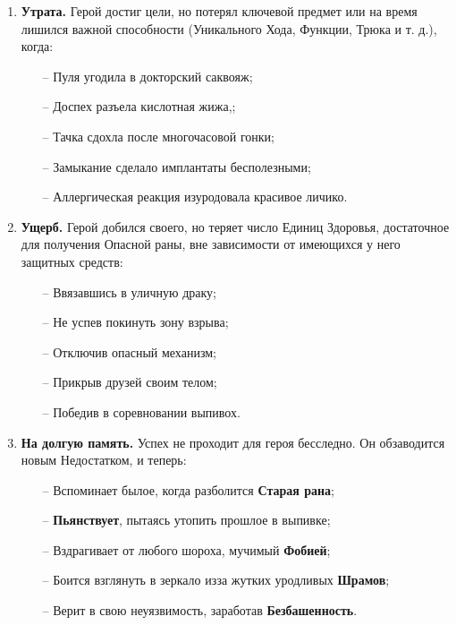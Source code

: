 \begin{enumerate}
\item \textbf{Утрата.} Герой достиг цели, но потерял ключевой предмет или на время лишился важной способности (Уникального Хода, Функции, Трюка и т. д.), когда:
\begin{itemize}
    \item[--] Пуля угодила в докторский саквояж;
    \item[--] Доспех разъела кислотная жижа,;
    \item[--] Тачка сдохла после многочасовой гонки;
    \item[--] Замыкание сделало имплантаты бесполезными;
    \item[--] Аллергическая реакция изуродовала красивое личико.
\end{itemize}

\item \textbf{Ущерб.} Герой добился своего, но теряет число Единиц Здоровья, достаточное для получения Опасной раны, вне зависимости от имеющихся у него защитных средств:
\begin{itemize}
    \item[--] Ввязавшись в уличную драку;
    \item[--] Не успев покинуть зону взрыва;
    \item[--] Отключив опасный механизм;
    \item[--] Прикрыв друзей своим телом;
    \item[--] Победив в соревновании выпивох.
\end{itemize}

\item \textbf{На долгую память.} Успех не проходит для героя бесследно. Он обзаводится новым Недостатком, и теперь:
\begin{itemize}
    \item[--] Вспоминает былое, когда разболится \textbf{Старая рана};
    \item[--] \textbf{Пьянствует}, пытаясь утопить прошлое в выпивке;
    \item[--] Вздрагивает от любого шороха, мучимый \textbf{Фобией};
    \item[--] Боится взглянуть в зеркало изза жутких уродливых \textbf{Шрамов};
    \item[--] Верит в свою неуязвимость, заработав \textbf{Безбашенность}.
\end{itemize}

\end{enumerate}


